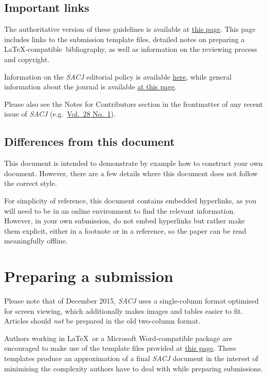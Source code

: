 \documentclass[submission]{sacjsub}
\begin{document}
\subsection{Important links}
The authoritative version of these guidelines is available at \href{http://sacj.cs.uct.ac.za/index.php/sacj/about/submissions}{this page}. This page includes links to the submission template files, detailed notes on preparing a \LaTeX-compatible~bibliography, as well as information on the reviewing process and copyright.

Information on the {\em SACJ} editorial policy is available \href{http://sacj.cs.uct.ac.za/index.php/sacj/about/editorialPolicies}{here}, while general information about the journal is available \href{http://sacj.cs.uct.ac.za/index.php/sacj/about}{at this page}. 

Please also see the Notes for Contributors section in the frontmatter of any recent issue of {\em SACJ} (e.g.~\href{http://sacj.cs.uct.ac.za/index.php/sacj/article/view/403/184}{Vol.~28 No.~1}).

\subsection{Differences from this document}
This document is intended to demonstrate by example how to construct your own document. However, there are a few details where this document does not follow the correct style.

For simplicity of reference, this document contains embedded hyperlinks, as you will need to be in an online environment to find the relevant information. However, in your own submission, do not embed hyperlinks but rather make them explicit, either in a footnote or in a reference, so the paper can be read meaningfully offline.

\section{Preparing a submission}
Please note that of December 2015, {\em SACJ} uses a single-column format optimised for screen viewing, which additionally makes images and tables easier to fit. Articles should \emph{not} be prepared in the old two-column format. 

Authors working in \LaTeX~or a Microsoft Word-compatible package are encouraged to make use of the template files provided at \href{http://sacj.cs.uct.ac.za/index.php/sacj/about/submissions#authorGuidelines}{this page}. These templates produce an approximation of a final {\em SACJ} document in the interest of minimising the complexity authors have to deal with while preparing submissions. 
\end{document}
